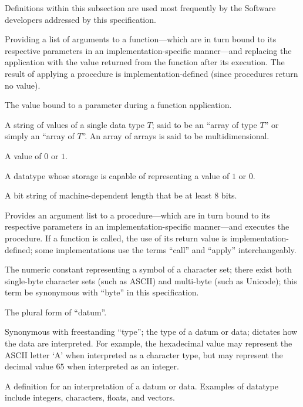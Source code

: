 %

Definitions within this subsection are used most frequently by the Software
developers addressed by this specification.

\begin{description}
  Providing a list of arguments to a function---which are in turn bound to its
  respective parameters in an implementation-specific manner---and replacing the
  application with the value returned from the function after its execution. The
  result of applying a procedure is implementation-defined (since procedures
  return no value).

  The value bound to a parameter during a function application.

  A string of values of a single data type $T$; said to be an ``array of type
  $T$'' or simply an ``array of $T$''. An array of arrays is said to be
  multidimensional.

  A value of $0$ or $1$.

  A datatype whose storage is capable of representing a value of $1$ or $0$.

  A bit string of machine-dependent length that \shall be at least $8$ bits.

  Provides an argument list to a procedure---which are in turn bound to its
  respective parameters in an implementation-specific manner---and executes the
  procedure. If a function is called, the use of its return value is
  implementation-defined; some implementations use the terms ``call'' and
  ``apply'' interchangeably.

  The numeric constant representing a symbol of a character set; there exist
  both single-byte character sets (such as ASCII) and multi-byte (such as
  Unicode); this term \shallnot be synonymous with ``byte'' in this
  specification.

  The plural form of ``datum''.

  Synonymous with freestanding ``type''; the type of a datum or data; dictates
  how the data are interpreted. For example, the hexadecimal value  may
  represent the ASCII letter `A' when interpreted as a character type, but may
  represent the decimal value $65$ when interpreted as an integer.

  A definition for an interpretation of a datum or data. Examples of datatype
  include integers, characters, floats, and vectors.


\end{description}
